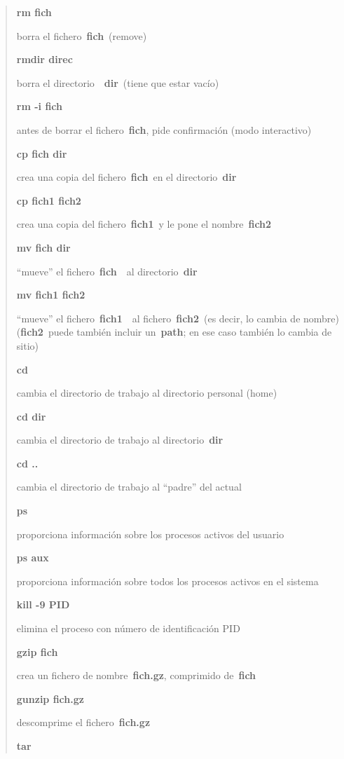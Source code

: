 \documentclass[
  letterpaper,
]{article}
\begin{document}
\begin{quote}
\textbf{rm fich}

borra el fichero~\textbf{fich}~(remove)

\textbf{rmdir direc}

borra el directorio~~\textbf{dir}~(tiene que estar vacío)

\textbf{rm -i fich}

antes de borrar el fichero~\textbf{fich}, pide confirmación (modo
interactivo)

\textbf{cp fich dir}

crea una copia del fichero~\textbf{fich}~en el directorio~\textbf{dir}

\textbf{cp fich1 fich2}

crea una copia del fichero~\textbf{fich1}~y le pone el
nombre~\textbf{fich2}

\textbf{mv fich dir}

``mueve'' el fichero~\textbf{fich}~~al directorio~\textbf{dir}

\textbf{mv fich1 fich2}

``mueve'' el fichero~\textbf{fich1}~~al fichero~\textbf{fich2}~(es
decir, lo cambia de nombre) (\textbf{fich2}~puede también incluir
un~\textbf{path}; en ese caso también lo cambia de sitio)

\textbf{cd}

cambia el directorio de trabajo al directorio personal (home)

\textbf{cd dir}

cambia el directorio de trabajo al directorio~\textbf{dir}

\textbf{cd ..}

cambia el directorio de trabajo al ``padre'' del actual

\textbf{ps}

proporciona información sobre los procesos activos del usuario

\textbf{ps aux}

proporciona información sobre todos los procesos activos en el sistema

\textbf{kill -9 PID}

elimina el proceso con número de identificación PID

\textbf{gzip fich}

crea un fichero de nombre~\textbf{fich.gz}, comprimido de~\textbf{fich}

\textbf{gunzip fich.gz}

descomprime el fichero~\textbf{fich.gz}

\textbf{tar}


\end{quote}
\end{document}
